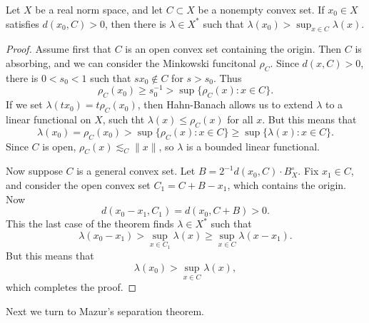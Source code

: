 \begin{theorem}
    Let $X$ be a real norm space, and let $C \subset X$ be a nonempty convex set. If $x_0 \in X$ satisfies $d(x_0,C) > 0$, then there is $\lambda \in X^*$ such that $\lambda(x_0) > \sup_{x \in C} \lambda(x)$.
\end{theorem}
\begin{proof}
    Assume first that $C$ is an open convex set containing the origin. Then $C$ is absorbing, and we can consider the Minkowski funcitonal $\rho_C$. Since $d(x,C) > 0$, there is $0 < s_0 < 1$ such that $sx_0 \not \in C$ for $s > s_0$. Thus
    \[ \rho_C(x_0) \geq s_0^{-1} > \sup \{ \rho_C(x) : x \in C \}. \]
    If we set $\lambda(t x_0) = t \rho_C(x_0)$, then Hahn-Banach allows us to extend $\lambda$ to a linear functional on $X$, such tht $\lambda(x) \leq \rho_C(x)$ for all $x$. But this means that
    \[ \lambda(x_0) = \rho_C(x_0) > \sup \{ \rho_C(x): x \in C \} \geq \sup \{ \lambda(x): x \in C \}. \]
    Since $C$ is open, $\rho_C(x) \lesssim_C \| x \|$, so $\lambda$ is a bounded linear functional.

    Now suppose $C$ is a general convex set. Let $B = 2^{-1} d(x_0,C) \cdot B_X^\circ$. Fix $x_1 \in C$, and consider the open convex set $C_1 = C + B - x_1$, which contains the origin. Now
    \[ d(x_0 - x_1, C_1) = d(x_0, C + B) > 0. \]
    This the last case of the theorem finds $\lambda \in X^*$ such that
    \[ \lambda(x_0 - x_1) > \sup_{x \in C_1} \lambda(x) \geq \sup_{x \in C} \lambda(x - x_1). \]
    But this means that
    \[ \lambda(x_0) > \sup_{x \in C} \lambda(x), \]
    which completes the proof.
\end{proof}

Next we turn to Mazur's separation theorem.

